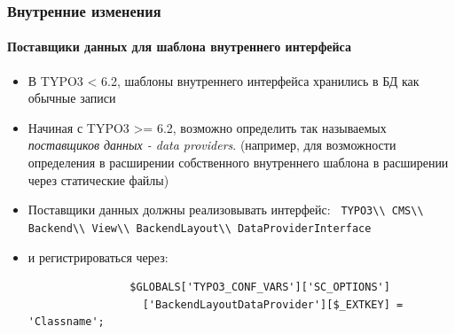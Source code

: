 
\begin{frame}[fragile]
	\frametitle{Внутренние изменения}
	\framesubtitle{Поставщики данных для шаблона внутреннего интерфейса}

	\begin{itemize}
		\item В TYPO3 < 6.2, шаблоны внутреннего интерфейса хранились в БД как обычные записи
		\item Начиная с TYPO3 >= 6.2, возможно определить так называемых \emph{поставщиков данных - data providers}.\newline
			\small(например, для возможности определения в расширении собственного внутреннего шаблона в расширении через 
			статические файлы)
			\normalsize

		\item Поставщики данных должны реализовывать интерфейс:\newline
			\smaller\texttt{
				TYPO3\textbackslash\textbackslash
				CMS\textbackslash\textbackslash
				Backend\textbackslash\textbackslash
				View\textbackslash\textbackslash
				BackendLayout\textbackslash\textbackslash
				DataProviderInterface}\normalsize

		\item и регистрироваться через:

			\begin{lstlisting}
				$GLOBALS['TYPO3_CONF_VARS']['SC_OPTIONS']
				  ['BackendLayoutDataProvider'][$_EXTKEY] = 'Classname';
			\end{lstlisting}


	\end{itemize}

\end{frame}


